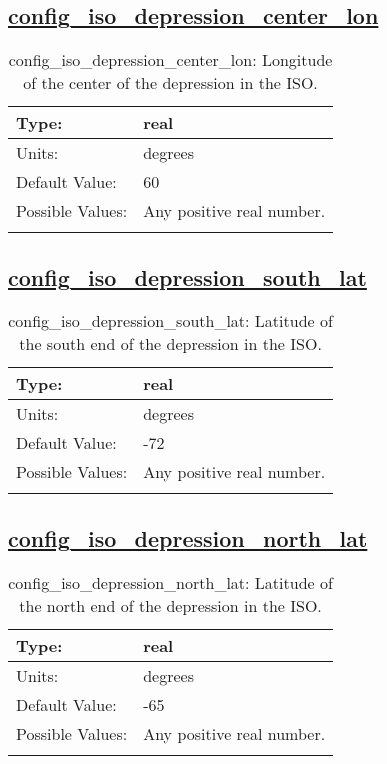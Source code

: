 \subsection[config\_iso\_depression\_center\_lon]{\hyperref[sec:nm_tab_iso]{config\_iso\_depression\_center\_lon}}
\label{subsec:nm_sec_config_iso_depression_center_lon}
\begin{center}
\begin{longtable}{| p{2.0in} || p{4.0in} |}
    \hline
    Type: & real \\
    \hline
    Units: & \si{degrees} \\
    \hline
    Default Value: & 60 \\
    \hline
    Possible Values: & Any positive real number. \\
    \hline
    \caption{config\_iso\_depression\_center\_lon: Longitude of the center of the depression in the ISO.}
\end{longtable}
\end{center}
\subsection[config\_iso\_depression\_south\_lat]{\hyperref[sec:nm_tab_iso]{config\_iso\_depression\_south\_lat}}
\label{subsec:nm_sec_config_iso_depression_south_lat}
\begin{center}
\begin{longtable}{| p{2.0in} || p{4.0in} |}
    \hline
    Type: & real \\
    \hline
    Units: & \si{degrees} \\
    \hline
    Default Value: & -72 \\
    \hline
    Possible Values: & Any positive real number. \\
    \hline
    \caption{config\_iso\_depression\_south\_lat: Latitude of the south end of the depression in the ISO.}
\end{longtable}
\end{center}
\subsection[config\_iso\_depression\_north\_lat]{\hyperref[sec:nm_tab_iso]{config\_iso\_depression\_north\_lat}}
\label{subsec:nm_sec_config_iso_depression_north_lat}
\begin{center}
\begin{longtable}{| p{2.0in} || p{4.0in} |}
    \hline
    Type: & real \\
    \hline
    Units: & \si{degrees} \\
    \hline
    Default Value: & -65 \\
    \hline
    Possible Values: & Any positive real number. \\
    \hline
    \caption{config\_iso\_depression\_north\_lat: Latitude of the north end of the depression in the ISO.}
\end{longtable}
\end{center}
